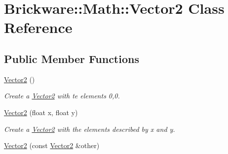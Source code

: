 \hypertarget{classBrickware_1_1Math_1_1Vector2}{}\section{Brickware\+:\+:Math\+:\+:Vector2 Class Reference}
\label{classBrickware_1_1Math_1_1Vector2}
\subsection*{Public Member Functions}
\begin{DoxyCompactItemize}
\item 
\hypertarget{classBrickware_1_1Math_1_1Vector2_a22104d1809be26a419ef1f959e3761bf}{}\hyperlink{classBrickware_1_1Math_1_1Vector2_a22104d1809be26a419ef1f959e3761bf}{Vector2} ()\label{classBrickware_1_1Math_1_1Vector2_a22104d1809be26a419ef1f959e3761bf}

\begin{DoxyCompactList}\small\item\em Create a \hyperlink{classBrickware_1_1Math_1_1Vector2}{Vector2} with te elements 0,0. \end{DoxyCompactList}\item 
\hypertarget{classBrickware_1_1Math_1_1Vector2_a061ab58a0e216c759d64e3746d712b12}{}\hyperlink{classBrickware_1_1Math_1_1Vector2_a061ab58a0e216c759d64e3746d712b12}{Vector2} (float x, float y)\label{classBrickware_1_1Math_1_1Vector2_a061ab58a0e216c759d64e3746d712b12}

\begin{DoxyCompactList}\small\item\em Create a \hyperlink{classBrickware_1_1Math_1_1Vector2}{Vector2} with the elements described by x and y. \end{DoxyCompactList}\item 
\hypertarget{classBrickware_1_1Math_1_1Vector2_ac0c70e89b089fb619dae62c32ccde4ec}{}\hyperlink{classBrickware_1_1Math_1_1Vector2_ac0c70e89b089fb619dae62c32ccde4ec}{Vector2} (const \hyperlink{classBrickware_1_1Math_1_1Vector2}{Vector2} \&other)\label{classBrickware_1_1Math_1_1Vector2_ac0c70e89b089fb619dae62c32ccde4ec}


\end{DoxyCompactItemize}
